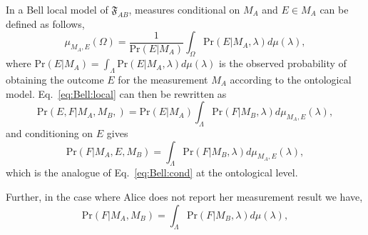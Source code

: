 \documentclass[DIV=calc,paper=a4,fontsize=11pt,twocolumn]{scrartcl} %
\theoremstyle{definition}
\theoremstyle{plain}
\begin{document}
In a Bell local model of $\mathfrak{F}_{AB}$, measures conditional on
$M_A$ and $E \in M_A$ can be defined as follows,
\begin{equation}
\label{eq:Bell:condprobs}
\mu_{M_A,E}(\Omega) = \frac{1}{\text{Pr}(E|M_A)}\int_{\Omega}
\text{Pr}(E|M_A,\lambda) d\mu(\lambda),
\end{equation}
where $\text{Pr}(E|M_A) = \int_{\Lambda}
\text{Pr}(E|M_A,\lambda)d\mu(\lambda)$ is the observed probability of
obtaining the outcome $E$ for the measurement $M_A$ according to the
ontological model.  Eq.~\eqref{eq:Bell:local} can then be
rewritten as
\begin{equation}
\text{Pr}(E,F|M_A,M_B,) = \text{Pr}(E|M_A)\int_{\Lambda} \text{Pr}(F|M_B,\lambda)
d\mu_{M_A,E}(\lambda),
\end{equation}
and conditioning on $E$ gives
\begin{equation}
\text{Pr}(F|M_A,E,M_B) = \int_{\Lambda} \text{Pr}(F|M_B,\lambda)
d\mu_{M_A,E}(\lambda),
\end{equation}
which is the analogue of Eq.~\eqref{eq:Bell:cond} at the ontological
level.

Further, in the case where Alice does not report her measurement
result we have,
\begin{equation}
\text{Pr}(F|M_A,M_B) = \int_{\Lambda} \text{Pr}(F|M_B,\lambda)
d\mu(\lambda),
\end{equation}
\end{document}
